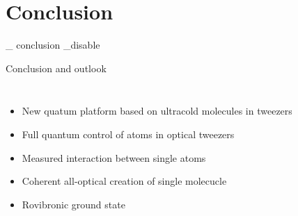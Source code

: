 \documentclass{beamer}
\newcommand\ifSlide[1]{
    \expandafter\ifcsname slide_ #1 _disable \endcsname
    \else
  }
\newcommand\ifSlide[1]{
    \expandafter\ifcsname slide_ #1 _enable \endcsname
  }
\begin{document}
\section{Conclusion}
\ifSlide{conclusion}
\begin{frame}[t]{Conclusion and outlook}
  \vspace{-0.5cm}
  \begin{columns}
    \column{6.25cm}
    \begin{itemize}
    \item New quatum platform based on ultracold molecules in tweezers
    \item<2-> Full quantum control of atoms in optical tweezers
    \item<3-> Measured interaction between single atoms
    \item<4-> Coherent all-optical creation of single molecucle
    \item<5-> Rovibronic ground state
    \end{itemize}
    \column{5.7cm}
  \end{columns}
\end{frame}
\fi
\end{document}
